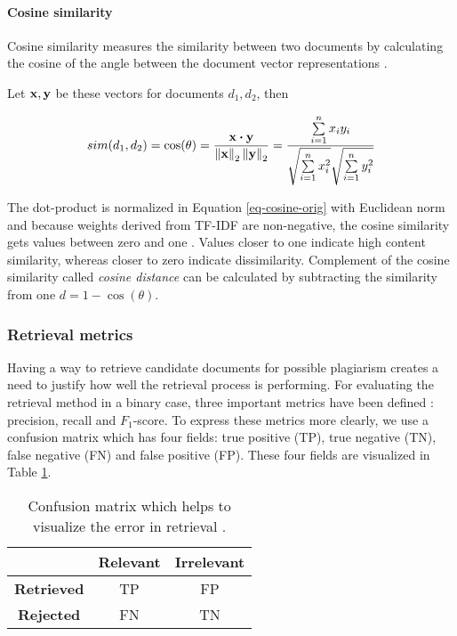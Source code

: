\paragraph{Cosine similarity}

Cosine similarity measures the similarity between two documents by calculating the cosine of the angle between the document vector representations \cite{Manning:2008:IIR:1394399}. 

Let $\mathbf{x}, \mathbf{y}$ be these vectors for documents $d_1, d_2$, then

\begin{equation} \label{eq-cosine-orig}
    sim(d_1, d_2) = \cos(\theta) = \dfrac{\mathbf{x} \boldsymbol{\cdot} \mathbf{y}}
                          {\left\lVert\mathbf{x}\right\rVert_2 \left\lVert\mathbf{y}\right\rVert_2} = 
                          \dfrac{\sum \limits_{i=1}^n x_i y_i}
                                {\sqrt{\sum \limits_{i=1}^n {x}_i^2} \sqrt{\sum \limits_{i=1}^n y_i^2}}
\end{equation}

\noindent
The dot-product is normalized in Equation \ref{eq-cosine-orig} with Euclidean norm and because weights derived from TF-IDF are non-negative, the cosine similarity gets values between zero and one \cite{Manning:2008:IIR:1394399}. Values closer to one indicate high content similarity, whereas closer to zero indicate dissimilarity. Complement of the cosine similarity called \emph{cosine distance} can be calculated by subtracting the similarity from one \ie $d = 1 - \cos(\theta)$.

\subsubsection{Retrieval metrics}

Having a way to retrieve candidate documents for possible plagiarism creates a need to justify how well the retrieval process is performing. For evaluating the retrieval method in a binary case, three important metrics have been defined \cite{Manning:2008:IIR:1394399}: precision, recall and $F_1$-score. To express these metrics more clearly, we use a confusion matrix which has four fields: true positive (TP), true negative (TN), false negative (FN) and false positive (FP). These four fields are visualized in Table \ref{tbl-confmatr-orig}.


\begin{table}[ht]
\centering
\caption{Confusion matrix which helps to visualize the error in retrieval \cite{Manning:2008:IIR:1394399}.}
\label{tbl-confmatr-orig}
\begin{tabular}{c|c|c}
          & \bf Relevant & \bf Irrelevant \\ \hline
\bf Retrieved & TP      & FP        \\
\bf Rejected  & FN      & TN       
\end{tabular}
\end{table}

